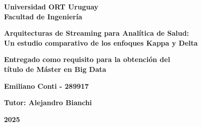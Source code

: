 \begin{titlepage}
    \centering
    \vspace*{1.5cm}
    
    {\large \textbf{Universidad ORT Uruguay\\
    Facultad de Ingeniería}\par}
    
    \vspace{1.5cm}
    
    {\LARGE\bfseries Arquitecturas de Streaming para Analítica de Salud:\\[0.4em]
    Un estudio comparativo de los enfoques Kappa y Delta \par}
    
    \vspace{1.5cm}
    
    {\large \textbf{Entregado como requisito para la obtención del\\
    título de Máster en Big Data} \par}
    
    \vspace{3cm}
    
    {\large \textbf{Emiliano Conti - 289917}\par}
    
    \vspace{1cm}
    
    {\large \textbf{Tutor: Alejandro Bianchi} \par}
    
    \vspace{1cm}
    
    {\Large \textbf{2025}\par}
    \thispagestyle{empty}
\end{titlepage}
